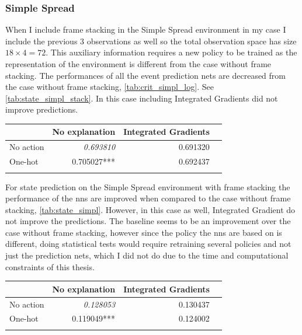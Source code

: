 \documentclass[UKenglish]{uiomasterthesis}
\begin{document}
\subsubsection{Simple Spread}
\label{sec:simpl_exp3}
When I include frame stacking in the Simple Spread environment in my case I include the previous 3 observations as well so the total observation space has size $18\times 4 = 72$. This auxiliary information requires a new policy to be trained as the representation of the environment is different from the case without frame stacking. The performances of all the event prediction nets are decreased from the case without frame stacking, \cref{tab:crit_simpl_log}. See \cref{tab:state_simpl_stack}. In this case including Integrated Gradients did not improve predictions.

\begin{center}
\label{tab:state_simpl_stack}
\begin{tabular}{lrrr}
\toprule
 & No explanation & Integrated Gradients \\
\midrule
    No action & \textit{0.693810} & 0.691320 \\
One-hot & 0.705027*** & 0.692437 \\
\bottomrule
\addlinespace[2pt]
\multicolumn{3}{l}{\textsuperscript{***}$p<0.001$, 
  \textsuperscript{**}$p<0.01$, 
  \textsuperscript{*}$p<0.05$}
\end{tabular}
\end{center}

For state prediction on the Simple Spread environment with frame stacking the performance of the \acp{nn} are improved when compared to the case without frame stacking, \ref{tab:state_simpl}. However, in this case as well, Integrated Gradient do not improve the predictions. The baseline seems to be an improvement over the case without frame stacking, however since the policy the \acp{nn} are based on is different, doing statistical tests would require retraining several policies and not just the prediction nets, which I did not do due to the time and computational constraints of this thesis.

\begin{center}
\label{tab:event_simpl_stack}
\begin{tabular}{lrrr}
\toprule
 & No explanation & Integrated Gradients \\
\midrule
No action & \textit{0.128053} & 0.130437 \\
One-hot & 0.119049*** & 0.124002 \\
\bottomrule
\addlinespace[2pt]
\multicolumn{3}{l}{\textsuperscript{***}$p<0.001$, 
  \textsuperscript{**}$p<0.01$, 
  \textsuperscript{*}$p<0.05$}
\end{tabular}
\end{center}
\end{document}
